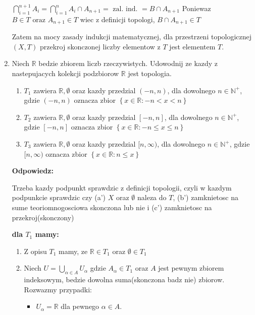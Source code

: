 \documentclass{article}
\begin{document}
\begin{enumerate}
$\bigcap\limits_{i = 1}^{n+1}A_{i} = \bigcap\limits_{i = 1}^{n}A_{i} \cap A_{n+1} = \text{ zal. ind. } = B \cap A_{n+1}$
Poniewaz $B \in T \text{ oraz } A_{n+1} \in T$ wiec z definicji topologi, $B \cap A_{n+1} \in T$  

Zatem na mocy zasady indukcji matematycznej, dla przestrzeni topologicznej $(X,T)$ przekroj skonczonej liczby elementow z $T$ jest elementem $T$.

\item Niech $\mathbb{R}$ bedzie zbiorem liczb rzeczywistych. Udowodnij ze kazdy z nastepujacych kolekcji podzbiorow $\mathbb{R}$ jest topologia.

\begin{enumerate}[label=(\alph*)]
\item $T_{1}$ zawiera $\mathbb{R}, \emptyset$ oraz kazdy przedzial $(-n, n)$, dla dowolnego $n \in {\mathbb{N}}^{+}$, gdzie $(-n, n)$ oznacza zbior $\left\{x \in \mathbb{R}: -n < x <n\right\}$
 
\item $T_{2}$ zawiera $\mathbb{R}, \emptyset$ oraz kazdy przedzial $[-n, n]$, dla dowolnego $n \in {\mathbb{N}}^{+}$, gdzie $[-n, n]$ oznacza zbior $\left\{x \in \mathbb{R}: -n \leq x \leq n\right\}$
       
\item $T_{3}$ zawiera $\mathbb{R}, \emptyset$ oraz kazdy przedzial $[n, \infty)$, dla dowolnego $n \in {\mathbb{N}^{+}}$, gdzie $[n, \infty)$ oznacza zbior $\left\{x \in \mathbb{R}: n \leq x\right\}$
    
\end{enumerate}

\textbf{Odpowiedz:}

Trzeba kazdy podpunkt sprawdzic z definicji topologii, czyli w kazdym podpunkcie sprawdzic czy (a') $X$ oraz $\emptyset$ naleza do $T$, (b') zamknietosc na sume teoriomnogosciowa skonczona lub nie i (c') zamknietosc na przekroj(skonczony)

\textbf{dla $T_{1}$ mamy:}
\begin{enumerate}[label=(\alph*')]
\item Z opisu $T_{1}$ mamy, ze $ \mathbb{R} \in T_{1}$ oraz $\emptyset \in T_{1}$
\item Niech $U = \bigcup\limits_{\alpha \in A} U_{\alpha}$ gdzie $A_{\alpha} \in T_{1}$ oraz $A$ jest pewnym zbiorem indeksowym, bedzie dowolna suma(skonczona badz nie) zbiorow. Rozwazmy przypadki:
\begin{itemize}
\item $U_{\alpha} = \mathbb{R}$ dla pewnego $\alpha \in A$. 


\end{itemize}
\end{enumerate}
\end{enumerate}
\end{document}
